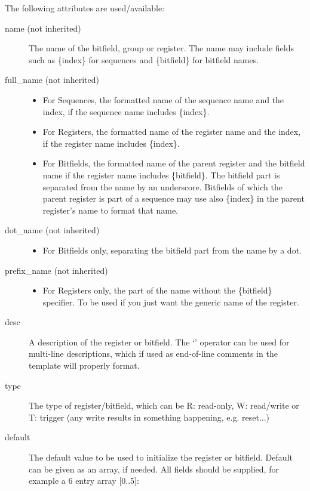 \documentclass[letterpaper,10pt,english]{sphinxmanual}
\begin{document}
The following attributes are used/available:
\begin{description}
\item[{name (not inherited)}] \leavevmode
The name of the bitfield, group or register. The name may include fields such as
\{index\} for sequences and \{bitfield\} for bitfield names.

\item[{full\_name (not inherited)}] \leavevmode\begin{itemize}
\item {} 
For Sequences, the formatted name of the sequence name and the index, if the
sequence name includes \{index\}.

\item {} 
For Registers, the formatted name of the register name and the index, if the
register name includes \{index\}.

\item {} 
For Bitfields, the formatted name of the parent register and the bitfield name
if the register name includes \{bitfield\}. The bitfield part is separated from
the name by an underscore.
Bitfields of which the parent register is part of a sequence may use also
\{index\} in the parent register's name to format that name.

\end{itemize}

\item[{dot\_name (not inherited)}] \leavevmode\begin{itemize}
\item {} 
For Bitfields only, separating the bitfield part from the name by a dot.

\end{itemize}

\item[{prefix\_name (not inherited)}] \leavevmode\begin{itemize}
\item {} 
For Registers only, the part of the name without the \{bitfield\} specifier.
To be used if you just want the generic name of the register.

\end{itemize}

\item[{desc}] \leavevmode
A description of the register or bitfield. The `\textbar{}' operator can be used
for multi-line descriptions, which if used as end-of-line comments in the
template will properly format.

\item[{type}] \leavevmode
The type of register/bitfield, which can be R: read-only, W: read/write or
T: trigger (any write results in something happening, e.g. reset...)

\item[{default}] \leavevmode
The default value to be used to initialize the register or bitfield.
Default can be given as an array, if needed. All fields should be supplied, for example
a 6 entry array {[}0..5{]}:

\end{description}
\end{document}
